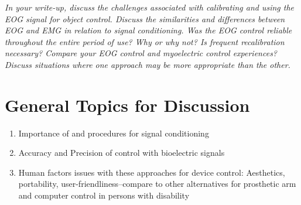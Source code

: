 \documentclass[10pt,oneside,a4paper]{article}
\begin{document}
\textit{In your write-up, discuss the challenges associated with calibrating and using the EOG signal for object control. Discuss the similarities and differences between EOG and EMG in relation to signal conditioning. Was the EOG control reliable throughout the entire period of use? Why or why not? Is frequent recalibration necessary? Compare your EOG control and myoelectric control experiences? Discuss situations where one approach may be more appropriate than the other.}
\section{General Topics for Discussion}
\begin{enumerate}
\item Importance of and procedures for signal conditioning
\item Accuracy and Precision of control with bioelectric signals
\item Human factors issues with these approaches for device control: Aesthetics, portability, user-friendliness--compare to other alternatives for prosthetic arm and computer control in persons with disability
\end{enumerate}
\end{document}
